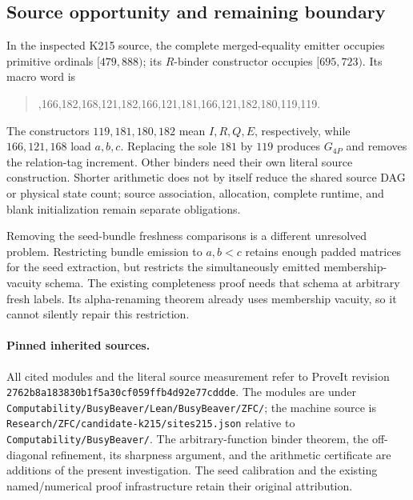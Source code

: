 \subsection{Source opportunity and remaining boundary}

In the inspected K215 source, the complete merged-equality emitter occupies
primitive ordinals $[479,888)$; its $R$-binder constructor occupies
$[695,723)$. Its macro word is
\begin{quote}\small{},166,182,168,121,182,166,121,181,166,121,182,180,119,119.
\end{quote}
The constructors $119,181,180,182$ mean $I,R,Q,E$, respectively, while
$166,121,168$ load $a,b,c$. Replacing the sole $181$ by $119$ produces
$G_{4P}$ and removes the relation-tag increment. Other binders need their
own literal source construction. Shorter arithmetic does not by itself
reduce the shared source DAG or physical state count; source association,
allocation, complete runtime, and blank initialization remain separate
obligations.

Removing the seed-bundle freshness comparisons is a different unresolved
problem. Restricting bundle emission to $a,b<c$ retains enough padded
matrices for the seed extraction, but restricts the simultaneously emitted
membership-vacuity schema. The existing completeness proof needs that
schema at arbitrary fresh labels. Its alpha-renaming theorem already uses
membership vacuity, so it cannot silently repair this restriction.

\paragraph{Pinned inherited sources.}
All cited modules and the literal source measurement refer to ProveIt
revision \texttt{2762b8a183830b1f5a30cf059ffb4d92e77cddde}.
The modules are under
\texttt{Computability/BusyBeaver/Lean/BusyBeaver/ZFC/}; the machine source
is \texttt{Research/ZFC/candidate-k215/sites215.json} relative to
\texttt{Computability/BusyBeaver/}. The arbitrary-function binder theorem,
the off-diagonal refinement, its sharpness argument, and the arithmetic
certificate are additions of the present investigation. The seed
calibration and the existing named/numerical proof infrastructure retain
their original attribution.
